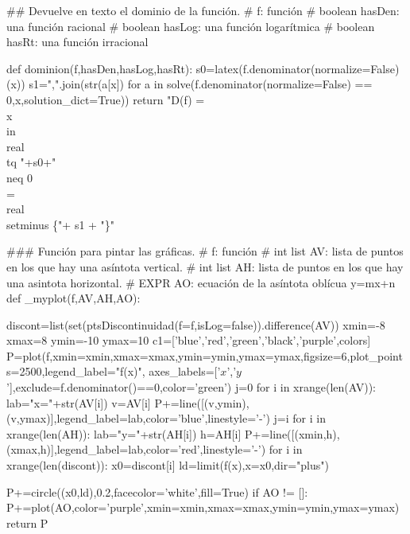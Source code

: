 \begin{sagesilent}
## Devuelve en texto el dominio de la función. 
# f: función
# boolean hasDen: una función racional
# boolean hasLog: una función logarítmica
# boolean hasRt: una función irracional

def dominion(f,hasDen,hasLog,hasRt):
 s0=latex(f.denominator(normalize=False)(x))
 s1=",".join(str(a[x]) for a in solve(f.denominator(normalize=False) == 0,x,solution_dict=True))
 return "D(f) = \\{x\\in\\real \\tq "+s0+" \\neq 0 \\} = \\real \\setminus \{"+ s1 + "\}"
 
### Función para pintar las gráficas.
# f: función
# int list AV: lista de puntos en los que hay una asíntota vertical.
# int list AH: lista de puntos en los que hay una asintota horizontal.
# EXPR AO: ecuación de la asíntota oblícua y=mx+n
def _myplot(f,AV,AH,AO):
 
 discont=list(set(ptsDiscontinuidad(f=f,isLog=false)).difference(AV))
 xmin=-8
 xmax=8
 ymin=-10
 ymax=10
 c1=['blue','red','green','black','purple',colors]
 P=plot(f,xmin=xmin,xmax=xmax,ymin=ymin,ymax=ymax,figsize=6,plot_points=2500,legend_label="f(x)", axes_labels=['$x$','$y$'],exclude=f.denominator()==0,color='green')
 j=0
 for i in xrange(len(AV)):
  lab="x="+str(AV[i])
  v=AV[i]
  P+=line([(v,ymin),(v,ymax)],legend_label=lab,color='blue',linestyle='-')
  j=i
 for i in xrange(len(AH)):
  lab="y="+str(AH[i])
  h=AH[i]
  P+=line([(xmin,h),(xmax,h)],legend_label=lab,color='red',linestyle='-')
 for i in xrange(len(discont)):
  x0=discont[i]
  ld=limit(f(x),x=x0,dir="plus")
  
  P+=circle((x0,ld),0.2,facecolor='white',fill=True)
 if AO != []:
  P+=plot(AO,color='purple',xmin=xmin,xmax=xmax,ymin=ymin,ymax=ymax)
 return P
\end{sagesilent}


